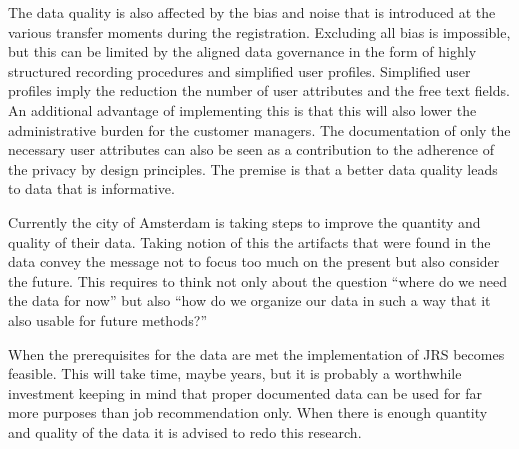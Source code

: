 The data quality is also affected by the bias and noise that is introduced at the various transfer moments during the registration.
Excluding all bias is impossible, but this can be limited by the aligned data governance in the form of highly structured recording procedures and simplified user profiles.
Simplified user profiles imply the reduction the number of user attributes and the free text fields. 
An additional advantage of implementing this is that this will also lower the administrative burden for the customer managers.
The documentation of only the necessary user attributes can also be seen as a contribution to the adherence of the privacy by design principles. 
The premise is that a better data quality leads to data that is informative.

Currently the city of Amsterdam is taking steps to improve the quantity and quality of their data. 
Taking notion of this the artifacts that were found in the data convey the message not to focus too much on the present but also consider the future.
This requires to think not only about the question “where do we need the data for now” but also “how do we organize our data in such a way that it also usable for future methods?”

When the prerequisites for the data are met the implementation of JRS becomes feasible.
This will take time, maybe years, but it is probably a worthwhile  investment keeping in mind that proper documented data can be used for far more purposes than job recommendation only.
When there is enough quantity and quality of the data it is advised to redo this research. 



